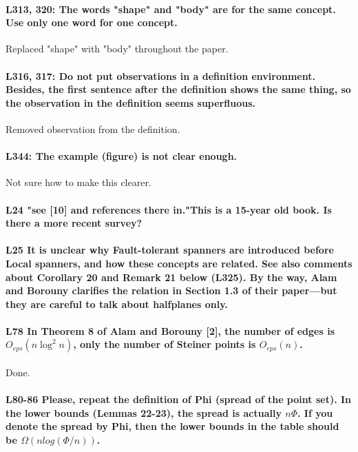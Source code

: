 \paragraph{L313, 320: The words "shape" and "body" are for the same concept. Use only one word for one concept.} Replaced "shape" with "body" throughout the paper.

\paragraph{L316, 317: Do not put observations in a definition environment. Besides, the first sentence after the definition shows the same thing, so the observation in the definition seems superfluous.} Removed observation from the definition.

\paragraph{L344: The example (figure) is not clear enough.}
Not sure how to make this clearer.

\paragraph{L24 "see [10] and references there in."This is a 15-year old book. Is there a more recent survey?} 

\paragraph{L25 It is unclear why Fault-tolerant spanners are introduced before Local spanners, and how these concepts are related. See also comments about Corollary 20 and Remark 21 below (L325). By the way, Alam and Borouny clarifies the relation in Section 1.3 of their paper---but they are careful to talk about halfplanes only.}

\paragraph{L78 In Theorem 8 of Alam and Borouny [2], the number of edges is $O_{eps}(n \log^2 n)$, only the number of Steiner points is $O_{eps}(n)$.} Done.

\paragraph{L80-86 Please, repeat the definition of Phi (spread of the point set). In the lower bounds (Lemmas 22-23), the spread is actually $n\Phi$. If you denote the spread by Phi, then the lower bounds in the table should be $\Omega(n log (\Phi/n))$.}

